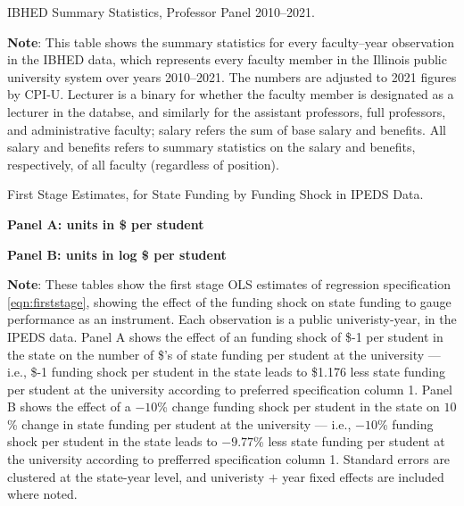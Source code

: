 \begin{table}[H]
    \singlespacing
    \centering
    \caption{IBHED Summary Statistics, Professor Panel 2010--2021.}
    \makebox[\textwidth][c]{}
    \label{tab:illinois-summary}

    \justify
    \footnotesize
    \textbf{Note}:
    This table shows the summary statistics for every faculty--year observation in the IBHED data, which represents every faculty member in the Illinois public university system over years 2010--2021.
    The numbers are adjusted to 2021 figures by CPI-U.
    Lecturer is a binary for whether the faculty member is designated as a lecturer in the databse, and similarly for the assistant professors, full professors, and administrative faculty;
    salary refers the sum of base salary and benefits.
    All salary and benefits refers to summary statistics on the salary and benefits, respectively, of all faculty (regardless of position).
\end{table}

\newpage
\begin{table}[H]
    \singlespacing
    \centering
    \caption{First Stage Estimates, for State Funding by Funding Shock in IPEDS Data.}
    \textbf{Panel A: units in \$ per student}
    
    \makebox[\textwidth][c]{}
    
    \textbf{Panel B: units in log \$ per student}
    
    \makebox[\textwidth][c]{}

    \label{tab:firststage-reg}
    \justify
    \footnotesize
    \textbf{Note}:
    These tables show the first stage OLS estimates of regression specification \eqref{eqn:firststage}, showing the effect of the funding shock on state funding to gauge performance as an instrument.
    Each observation is a public univeristy-year, in the IPEDS data.
    Panel A shows the effect of an funding shock of \$-1 per student in the state on the number of \$'s of state funding per student at the university --- i.e.,
    \$-1 funding shock per student in the state leads to \$1.176 less state funding per student at the university according to preferred specification column 1.
    Panel B shows the effect of a $-10$\% change funding shock per student in the state on $10$\% change in state funding per student at the university --- i.e.,
    $-10$\% funding shock per student in the state leads to $-9.77$\% less state funding per student at the university according to prefferred specification column 1.        
    Standard errors are clustered at the state-year level, and univeristy $+$ year fixed effects are included where noted.
\end{table}

